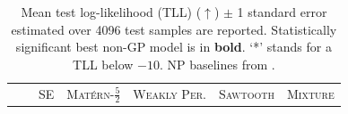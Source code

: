 \begin{table}[t]
	\centering
	\caption{
		Mean test log-likelihood (TLL) (\(\uparrow\)) \(\pm\) 1 standard error estimated over 4096 test samples are reported.
		Statistically significant best non-GP model is in \textbf{bold}.
		`*' stands for a TLL below \(-10\).
		NP baselines from \textcite{bruinsma2020Gaussian}.
	}
	\label{tab:1d_regression}
	\setlength{\tabcolsep}{3.5pt}
	\begin{tabular}{llrrrrr}
		\toprule
		 &                                                         & \multicolumn{1}{c}{\scshape SE}                                               & \multicolumn{1}{c}{\scshape Mat\'ern-\(\tfrac52\)}                             & \multicolumn{1}{c}{\scshape Weakly Per.}                           & \multicolumn{1}{c}{\scshape Sawtooth}                                         & \multicolumn{1}{c}{\scshape Mixture}                                          \\


\end{tabular}
\end{table}

